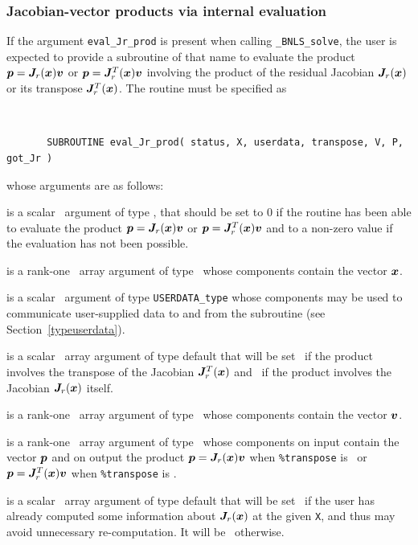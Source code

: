 \documentclass{galahad}
\newcommand{\packagename}{BNLS}
\newcommand{\fullpackagename}{\libraryname\_\packagename}
\newcommand{\solver}{{\tt \fullpackagename\_solve}}
\begin{document}

\subsubsection{Jacobian-vector products via internal evaluation\label{jvp}}

If the argument {\tt eval\_Jr\_prod} is present when calling \solver, the
user is expected to provide a subroutine of that name to evaluate the
product ${\bm{p}} = {\bm{J}}_r({\bm{x}}) {\bm{v}}$ or ${\bm{p}} = {\bm{J}}_r^T({\bm{x}}) {\bm{v}}$ involving the
product of the residual Jacobian ${\bm{J}}_r({\bm{x}})$ or its transpose 
${\bm{J}}_r^T({\bm{x}})$. The routine must be specified as

\def\baselinestretch{0.8}
{\tt
\begin{verbatim}
       SUBROUTINE eval_Jr_prod( status, X, userdata, transpose, V, P, got_Jr )
\end{verbatim} }
\def\baselinestretch{1.0}
\noindent whose arguments are as follows:

\begin{description}
 is a scalar \intentout\ argument of type \integer,
that should be set to 0 if the routine has been able to evaluate the
product ${\bm{p}} = {\bm{J}}_r({\bm{x}}) {\bm{v}}$ or ${\bm{p}} = {\bm{J}}_r^T({\bm{x}}) {\bm{v}}$
and to a non-zero value if the evaluation has not been possible.

 is a rank-one \intentin\ array argument of type \realdp\
whose components contain the vector ${\bm{x}}$.

 is a scalar \intentinout\ argument of type
{\tt USERDATA\_type} whose components may be used
to communicate user-supplied data to and from the subroutine
(see Section~\ref{typeuserdata}).

 is a scalar \intentin\ array argument of type
default that will be set \true\ if the product involves the transpose
of the Jacobian ${\bm{J}}_r^T({\bm{x}})$ and \false\ if the product involves
the Jacobian ${\bm{J}}_r({\bm{x}})$ itself.

 is a rank-one \intentin\ array argument of type \realdp\
whose components contain the vector ${\bm{v}}$.

 is a rank-one \intentinout\ array argument of type \realdp\
whose components on input contain the vector ${\bm{p}}$ and on output the
product ${\bm{p}} = {\bm{J}}_r({\bm{x}}) {\bm{v}}$ when {\tt \%transpose} is \false\ or
${\bm{p}} = {\bm{J}}_r^T({\bm{x}}) {\bm{v}}$ when {\tt \%transpose} is \true.

\itt{got\_Jr} is a scalar \intentin\ array argument of type
default that will be set \true\ if the user has already computed
some information about ${\bm{J}}_r({\bm{x}})$ at the given {\tt X}, and thus
may avoid unnecessary re-computation. It will be \false\ otherwise.

\end{description}
\end{document}
